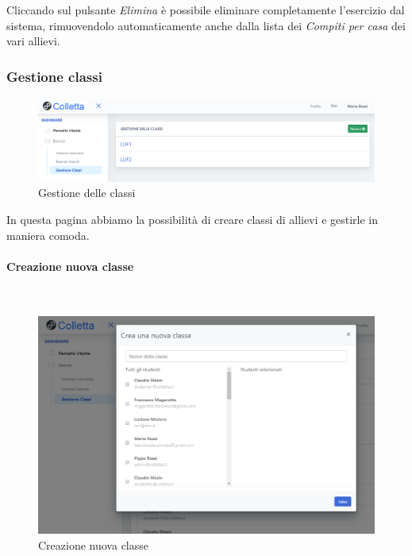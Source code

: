         	Cliccando sul pulsante \textit{Elimina} è possibile eliminare completamente l'esercizio dal sistema, rimuovendolo automaticamente anche dalla lista dei \textit{Compiti per casa} dei vari allievi.
        	
\newpage
        \subsubsection{Gestione classi}   
       
        \begin{figure}[H]
            	\centering
        		\includegraphics[width=17cm]{sez/img/insegnante/elencoclassi.PNG} 
            	\caption{Gestione delle classi}\label{fig:1}
        	\end{figure}          	
        	   
        In questa pagina abbiamo la possibilità di creare classi di allievi e gestirle  in maniera comoda. 

\paragraph{Creazione nuova classe}\mbox{}\\         

\begin{figure}[H]
            	\centering
        		\includegraphics[width=17cm]{sez/img/insegnante/creanuovaclasse.PNG} 
            	\caption{Creazione nuova classe}\label{fig:1}
        	\end{figure}            	

